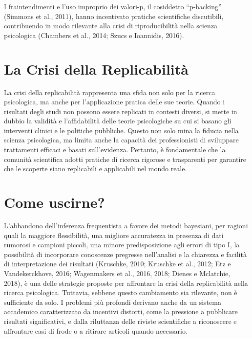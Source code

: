 \documentclass[
  letterpaper,
  krantz2]{{[}./krantz{]}}
\begin{document}
I fraintendimenti e l'uso improprio dei valori-p, il cosiddetto
``p-hacking'' (Simmons et al., 2011), hanno incentivato pratiche
scientifiche discutibili, contribuendo in modo rilevante alla crisi di
riproducibilità nella scienza psicologica (Chambers et al., 2014; Szucs
e Ioannidis, 2016).

\section*{La Crisi della
Replicabilità}\label{la-crisi-della-replicabilituxe0}


La crisi della replicabilità rappresenta una sfida non solo per la
ricerca psicologica, ma anche per l'applicazione pratica delle sue
teorie. Quando i risultati degli studi non possono essere replicati in
contesti diversi, si mette in dubbio la validità e l'affidabilità delle
teorie psicologiche su cui si basano gli interventi clinici e le
politiche pubbliche. Questo non solo mina la fiducia nella scienza
psicologica, ma limita anche la capacità dei professionisti di
sviluppare trattamenti efficaci e basati sull'evidenza. Pertanto, è
fondamentale che la comunità scientifica adotti pratiche di ricerca
rigorose e trasparenti per garantire che le scoperte siano replicabili e
applicabili nel mondo reale.

\section*{Come uscirne?}\label{come-uscirne}


L'abbandono dell'inferenza frequentista a favore dei metodi bayesiani,
per ragioni quali la maggiore flessibilità, una migliore accuratezza in
presenza di dati rumorosi e campioni piccoli, una minore predisposizione
agli errori di tipo I, la possibilità di incorporare conoscenze
pregresse nell'analisi e la chiarezza e facilità di interpretazione dei
risultati (Kruschke, 2010; Kruschke et al., 2012; Etz e Vandekerckhove,
2016; Wagenmakers et al., 2016, 2018; Dienes e Mclatchie, 2018), è una
delle strategie proposte per affrontare la crisi della replicabilità
nella ricerca psicologica. Tuttavia, sebbene questo cambiamento sia
rilevante, non è sufficiente da solo. I problemi più profondi derivano
anche da un sistema accademico caratterizzato da incentivi distorti,
come la pressione a pubblicare risultati significativi, e dalla
riluttanza delle riviste scientifiche a riconoscere e affrontare casi di
frode o a ritirare articoli quando necessario.
\end{document}
